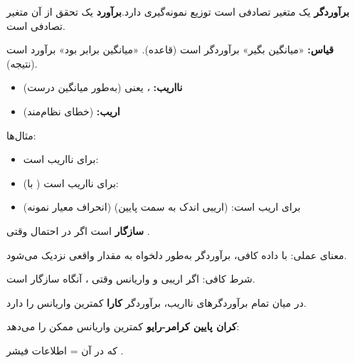 
\textbf{برآوردگر} یک متغیر تصادفی است  توزیع نمونه‌گیری دارد.\PSbr{}\textbf{برآورد} یک تحقق از آن متغیر تصادفی است.

\textbf{قیاس:} «میانگین بگیر» برآوردگر است (قاعده). «میانگین برابر  بود» برآورد است (نتیجه).




\begin{itemize}
\tightlist
\item
  \textbf{نااریب:} ، یعنی  (به‌طور میانگین درست)
\item
  \textbf{اریب:}  (خطای نظام‌مند)
\end{itemize}

مثال‌ها:

\begin{itemize}
\tightlist
\item
   برای \lr{$\mu$} نااریب است: 
\item
   (با ) برای  نااریب است: 
\item
   (انحراف معیار نمونه) برای \lr{$\sigma$} اریب است:  (اریبی اندک به سمت پایین)
\end{itemize}


 \textbf{سازگار} است اگر  در احتمال وقتی .

معنای عملی: با داده کافی، برآوردگر به‌طور دلخواه به مقدار واقعی نزدیک می‌شود.

شرط کافی: اگر اریبی  و واریانس  وقتی ، آنگاه سازگار است.


در میان تمام برآوردگرهای نااریب، برآوردگر \textbf{کارا} کمترین واریانس را دارد.

\textbf{کران پایین کرامر-رایو}  کمترین واریانس ممکن را می‌دهد:

که در آن  = اطلاعات فیشر .

